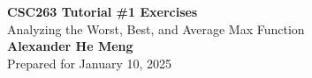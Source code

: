 \begin{titlepage}
    \null %
    \vfill
    \begin{center}
        {\fontsize{35}{48}\selectfont \bfseries CSC263 Tutorial \#1 Exercises}
        \vspace{20pt} \\
        {\LARGE Analyzing the Worst, Best, and Average Max Function} \\
        \vspace{20pt}
        \textbf{Alexander He Meng}
        \vspace{8pt}
        \\ Prepared for January 10, 2025
    \end{center}
    \vfill
\end{titlepage}
